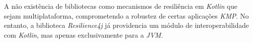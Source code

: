 A não existência de bibliotecas como mecanismos de resiliência em \textit{Kotlin} que sejam multiplataforma, comprometendo a robustez de certas aplicações \textit{KMP}.
No entanto, a biblioteca \textit{Resilience4j} já providencia um módulo de interoperabilidade com \textit{Kotlin}, mas apenas exclusivamente para a \textit{JVM}.
